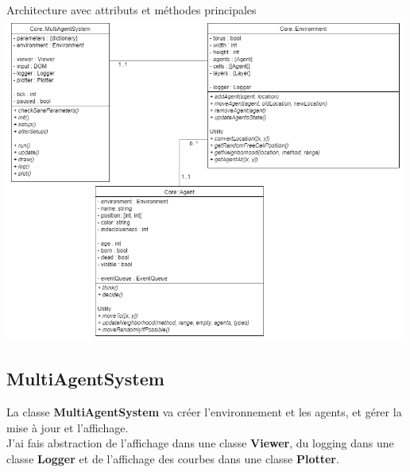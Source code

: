 \documentclass[11pt,a4paper,oneside]{report}
\begin{document}
\begin{center}
Architecture avec attributs et méthodes principales
\includegraphics[width=500px]{core}\\
\end{center}

\newpage

\subsection*{MultiAgentSystem}
La classe \textbf{MultiAgentSystem} va créer l'environnement et les agents, et gérer la mise à jour et l'affichage.\\
J'ai fais abstraction de l'affichage dans une classe \textbf{Viewer}, du logging dans une classe \textbf{Logger} et de l'affichage des courbes dans une classe \textbf{Plotter}.\\
\end{document}
